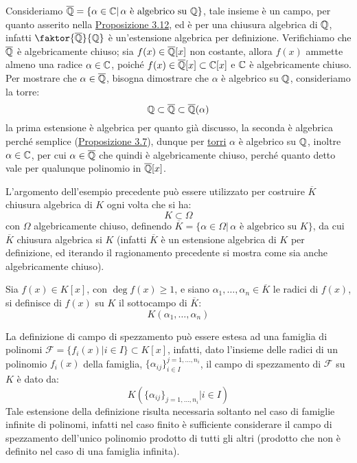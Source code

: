 \documentclass[11pt]{scrartcl}
\begin{document}
\begin{example}
    Consideriamo $\overline{\mathbb Q} = \{\alpha \in \mathbb C | \, \text{$\alpha$ è algebrico su $\mathbb Q$}\}$, tale insieme è un campo, per quanto asserito nella
    \hyperref[3.12]{Proposizione 3.12}, ed è per una chiusura algebrica di $\mathbb Q$, infatti $\faktor{\overline\QQ}{\QQ}$ è un'estensione algebrica per definizione.
    Verifichiamo che $\overline{\mathbb Q}$ è algebricamente chiuso; sia $f(x) \in \overline{\mathbb Q}[x]$ non costante, allora $f(x)$ ammette almeno una radice $\alpha \in \mathbb C$, poiché
    $f(x) \in \overline{\mathbb Q}[x] \subset \mathbb C[x]$ e $\mathbb C$ è algebricamente chiuso. Per mostrare che $\alpha \in \overline{\mathbb Q}$, bisogna
    dimostrare che $\alpha$ è algebrico su $\mathbb Q$, consideriamo la torre:
    \[ \mathbb Q \subset \overline {\mathbb Q} \subset \overline{\mathbb Q} (\alpha)
        \]
    la prima estensione è algebrica per quanto già discusso, la seconda è algebrica perché semplice (\hyperref[3.7]{Proposizione 3.7}), dunque per \hyperref[torri]{torri} $\alpha$
    è algebrico su $\mathbb Q$, inoltre $\alpha \in \mathbb C$, per cui $\alpha \in \overline{\mathbb Q}$ che quindi è algebricamente chiuso, perché quanto detto vale per qualunque polinomio in $\overline{\mathbb Q}[x]$.
\end{example}

\begin{remark}
    L'argomento dell'esempio precedente può essere utilizzato per costruire $\overline K$ chiusura algebrica di $K$ ogni volta che si ha:
    \[ K \subset \Omega
        \]
    con $\Omega$ algebricamente chiuso, definendo $\overline K = \{\alpha \in \Omega |  \, \text{$\alpha$ è algebrico su $K$}\}$, da cui $\overline K$ chiusura algebrica si $K$ (infatti $\overline K$ è un estensione algebrica 
    di $K$ per definizione, ed iterando il ragionamento precedente si mostra come sia anche algebricamente chiuso).
\end{remark}

\begin{definition}
    Sia $f(x) \in K[x]$, con $\deg f(x) \geq 1$, e siano $\alpha_1,\ldots,\alpha_n \in \overline K$ le radici di $f(x)$, si definisce  di $f(x)$ su $K$ il sottocampo di $\overline K$:
    \[ K(\alpha_1,\ldots,\alpha_n)
        \]
\end{definition}

\begin{remark}
    La definizione di campo di spezzamento può essere estesa ad una famiglia di polinomi $\mathcal{F} = \{f_i(x) | i \in I\} \subset K[x]$, infatti, dato l'insieme delle radici di un polinomio $f_i(x)$ della famiglia,
    $ \{\alpha_{ij}\}_{i \in I}^{j = 1,\ldots,n_i} $, il campo di spezzamento di $\mathcal{F}$ su $K$ è dato da:
    \[ K(\{\alpha_{ij}\}_{j = 1,\ldots,n_i} | i \in I)
        \]
    Tale estensione della definizione risulta necessaria soltanto nel caso di famiglie infinite di polinomi, infatti nel caso finito è sufficiente considerare il campo di spezzamento dell'unico polinomio prodotto di tutti gli altri 
    (prodotto che non è definito nel caso di una famiglia infinita).
\end{remark}
\end{document}
